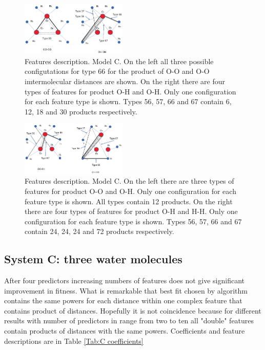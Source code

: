 \documentclass[aps,prl,reprint,amsmath,amssymb,nature]{revtex4-1}
\begin{document}
\begin{figure}
\includegraphics[width=0.45\textwidth]{media/water_distances_2.eps}
\caption{Features description. Model C. On the left all three possible configutations for type 66 for the product of O-O and O-O imtermolecular distances are shown. On the right there are four types of features for product O-H and O-H. Only one configuration for each feature type is shown. Types 56, 57, 66 and 67 contain 6, 12, 18 and 30 products respectively.}\label{Fig:C Dist1}
\end{figure}

\begin{figure}
\includegraphics[width=0.45\textwidth]{media/water_distances_3.eps}
\caption{Features description. Model C. On the left there are three types of features for product O-O and O-H. Only one configuration for each feature type is shown. All types contain 12 products. On the right there are four types of features for product O-H and H-H. Only one configuration for each feature type is shown. Types 56, 57, 66 and 67 contain 24, 24, 24 and 72 products respectively.}\label{Fig:C Dist2}
\end{figure}

\subsection{System C: three water molecules}

After four predictors increasing numbers of features does not give significant improvement in fitness. What is remarkable that best fit chosen by algorithm contains the same powers for each distance within one complex feature that contains product of distances. Hopefully it is not coincidence because for different results with number of predictors in range from two to ten all "double" features contain products of distances with the same powers. Coefficients and feature descriptions are in Table \ref{Tab:C coefficients}
\end{document}
